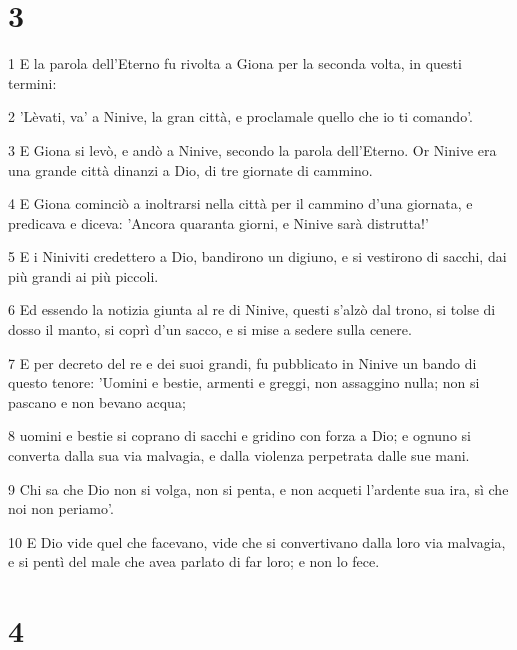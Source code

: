 \chapter{3}

\par 1 E la parola dell'Eterno fu rivolta a Giona per la seconda volta, in questi termini:
\par 2 'Lèvati, va' a Ninive, la gran città, e proclamale quello che io ti comando'.
\par 3 E Giona si levò, e andò a Ninive, secondo la parola dell'Eterno. Or Ninive era una grande città dinanzi a Dio, di tre giornate di cammino.
\par 4 E Giona cominciò a inoltrarsi nella città per il cammino d'una giornata, e predicava e diceva: 'Ancora quaranta giorni, e Ninive sarà distrutta!'
\par 5 E i Niniviti credettero a Dio, bandirono un digiuno, e si vestirono di sacchi, dai più grandi ai più piccoli.
\par 6 Ed essendo la notizia giunta al re di Ninive, questi s'alzò dal trono, si tolse di dosso il manto, si coprì d'un sacco, e si mise a sedere sulla cenere.
\par 7 E per decreto del re e dei suoi grandi, fu pubblicato in Ninive un bando di questo tenore: 'Uomini e bestie, armenti e greggi, non assaggino nulla; non si pascano e non bevano acqua;
\par 8 uomini e bestie si coprano di sacchi e gridino con forza a Dio; e ognuno si converta dalla sua via malvagia, e dalla violenza perpetrata dalle sue mani.
\par 9 Chi sa che Dio non si volga, non si penta, e non acqueti l'ardente sua ira, sì che noi non periamo'.
\par 10 E Dio vide quel che facevano, vide che si convertivano dalla loro via malvagia, e si pentì del male che avea parlato di far loro; e non lo fece.

\chapter{4}

